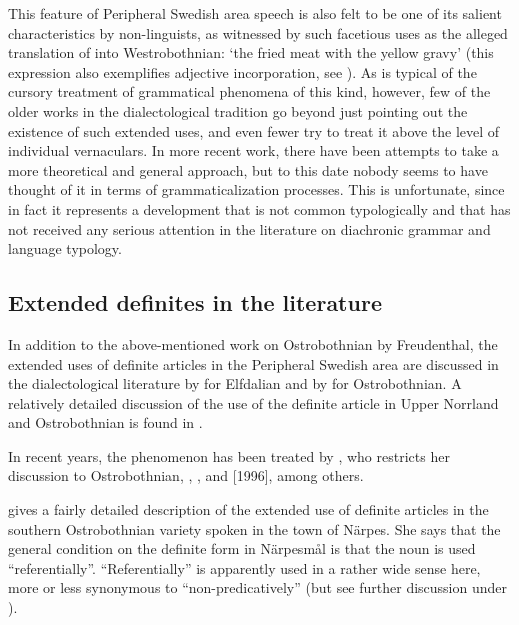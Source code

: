 	\z
\z
	

This feature of Peripheral Swedish area speech is also felt to be one of its salient characteristics by non-linguists, as witnessed by such facetious uses as the alleged translation of into Westrobothnian:  ‘the fried meat with the yellow gravy’ (this expression also exemplifies adjective incorporation, see ). As is typical of the cursory treatment of grammatical phenomena of this kind, however, few of the older works in the dialectological tradition go beyond just pointing out the existence of such extended uses, and even fewer try to treat it above the level of individual vernaculars. In more recent work, there have been attempts to take a more theoretical and general approach, but to this date nobody seems to have thought of it in terms of grammaticalization processes. This is unfortunate, since in fact it represents a development that is not common typologically and that has not received any serious attention in the literature on diachronic grammar and language typology.

\subsection{ Extended definites in the literature}

In addition to the above-mentioned work on Ostrobothnian by Freudenthal, the extended uses of definite articles in the Peripheral Swedish area are discussed in the dialectological literature by \citet{Levander1909} for Elfdalian and by \citet{Hummelstedt1934} for Ostrobothnian. A relatively detailed discussion of the use of the definite article in Upper Norrland and Ostrobothnian is found in \citet[281ff]{DahlstettEtAl1954}. 

In recent years, the phenomenon has been treated by \citet{Nikula1997}, who restricts her discussion to Ostrobothnian, \citet{Delsing1993}, \citet{Delsing2003b}, and \citet{HolmbergEtAl2003} [1996], among others.

\citet{Nikula1997} gives a fairly detailed description of the extended use of definite articles in the southern Ostrobothnian variety spoken in the town of Närpes. She says that the general condition on the definite form in Närpesmål is that the noun is used “referentially”. “Referentially” is apparently used in a rather wide sense here, more or less synonymous to “non-predicatively” (but see further discussion under ). 

